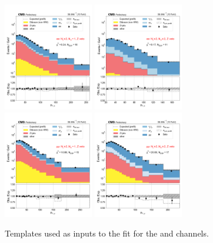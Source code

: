 \begin{figure}[htb!]
    \centering
    \includegraphics[width=0.35\textwidth]{chapters/Analysis/sectionStatisticalAnalysis/figures/fit/ee_cat_gt2_eq1_b}
    \includegraphics[width=0.35\textwidth]{chapters/Analysis/sectionStatisticalAnalysis/figures/fit/ee_cat_gt2_gt2_b}
    \includegraphics[width=0.35\textwidth]{chapters/Analysis/sectionStatisticalAnalysis/figures/fit/mumu_cat_gt2_eq1_b}
    \includegraphics[width=0.35\textwidth]{chapters/Analysis/sectionStatisticalAnalysis/figures/fit/mumu_cat_gt2_gt2_b}
    \caption{Templates used as inputs to the fit for the \cee and \cmm channels.}
    \label{fig:analysis:method:mle:fits_templates_ll}
\end{figure}

